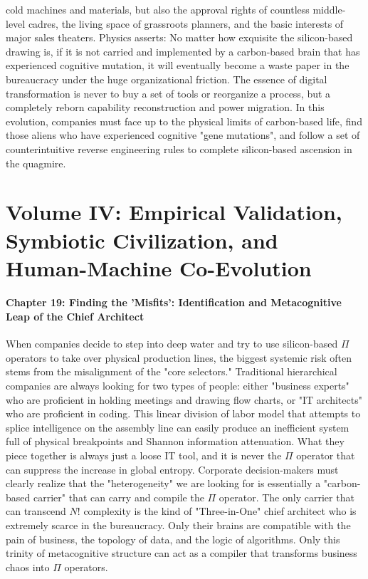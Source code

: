 \documentclass[11pt,a4paper]{article}
\begin{document}
cold machines and materials, but also the approval rights of countless middle-level cadres, the living space of grassroots planners, and the basic interests of major sales theaters. Physics asserts: No matter how exquisite the silicon-based drawing is, if it is not carried and implemented by a carbon-based brain that has experienced cognitive mutation, it will eventually become a waste paper in the bureaucracy under the huge organizational friction. The essence of digital transformation is never to buy a set of tools or reorganize a process, but a completely reborn capability reconstruction and power migration. In this evolution, companies must face up to the physical limits of carbon-based life, find those aliens who have experienced cognitive "gene mutations", and follow a set of counterintuitive reverse engineering rules to complete silicon-based ascension in the quagmire.

\newpage
\part*{Volume IV: Empirical Validation, Symbiotic Civilization, and Human-Machine Co-Evolution}

\subsection*{Chapter 19: Finding the 'Misfits': Identification and Metacognitive Leap of the Chief Architect}
When companies decide to step into deep water and try to use silicon-based $\Pi$ operators to take over physical production lines, the biggest systemic risk often stems from the misalignment of the "core selectors." Traditional hierarchical companies are always looking for two types of people: either "business experts" who are proficient in holding meetings and drawing flow charts, or "IT architects" who are proficient in coding. This linear division of labor model that attempts to splice intelligence on the assembly line can easily produce an inefficient system full of physical breakpoints and Shannon information attenuation. What they piece together is always just a loose IT tool, and it is never the $\Pi$ operator that can suppress the increase in global entropy. Corporate decision-makers must clearly realize that the "heterogeneity" we are looking for is essentially a "carbon-based carrier" that can carry and compile the $\Pi$ operator. The only carrier that can transcend $N!$ complexity is the kind of "Three-in-One" chief architect who is extremely scarce in the bureaucracy. Only their brains are compatible with the pain of business, the topology of data, and the logic of algorithms. Only this trinity of metacognitive structure can act as a compiler that transforms business chaos into $\Pi$ operators.
\end{document}
